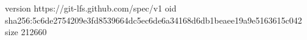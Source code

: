 version https://git-lfs.github.com/spec/v1
oid sha256:5c6de2754209e3fd8539664dc5ec6de6a34168d6db1beaee19a9e5163615c042
size 212660
